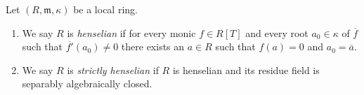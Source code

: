 \begin{definition}
\label{definition-henselian}
Let $(R, \mathfrak m, \kappa)$ be a local ring.
\begin{enumerate}
\item We say $R$ is {\it henselian} if for every monic $f \in R[T]$ and
every root $a_0 \in \kappa$ of $\overline{f}$ such that
$\overline{f'}(a_0) \not = 0$
there exists an $a \in R$ such that $f(a) = 0$ and
$a_0 = \overline{a}$.
\item We say $R$ is {\it strictly henselian} if $R$ is henselian
and its residue field is separably algebraically closed.
\end{enumerate}
\end{definition}